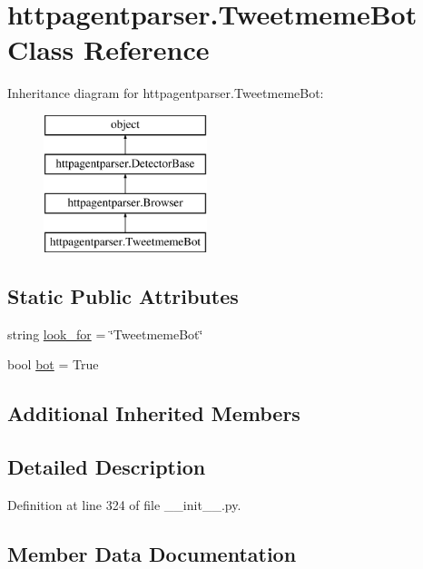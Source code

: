 \hypertarget{classhttpagentparser_1_1_tweetmeme_bot}{}\section{httpagentparser.\+Tweetmeme\+Bot Class Reference}
\label{classhttpagentparser_1_1_tweetmeme_bot}
Inheritance diagram for httpagentparser.\+Tweetmeme\+Bot\+:\begin{figure}[H]
\begin{center}
\leavevmode
\includegraphics[height=4.000000cm]{classhttpagentparser_1_1_tweetmeme_bot}
\end{center}
\end{figure}
\subsection*{Static Public Attributes}
\begin{DoxyCompactItemize}
\item 
string \hyperlink{classhttpagentparser_1_1_tweetmeme_bot_abdf14c9335f4685790d1ac31725f6485}{look\+\_\+for} = \char`\"{}Tweetmeme\+Bot\char`\"{}
\item 
bool \hyperlink{classhttpagentparser_1_1_tweetmeme_bot_adbdade0e6ba5083b2602a2f7a7fefb93}{bot} = True
\end{DoxyCompactItemize}
\subsection*{Additional Inherited Members}


\subsection{Detailed Description}


Definition at line 324 of file \+\_\+\+\_\+init\+\_\+\+\_\+.\+py.



\subsection{Member Data Documentation}
\hypertarget{classhttpagentparser_1_1_tweetmeme_bot_adbdade0e6ba5083b2602a2f7a7fefb93}{}\label{classhttpagentparser_1_1_tweetmeme_bot_adbdade0e6ba5083b2602a2f7a7fefb93} 

